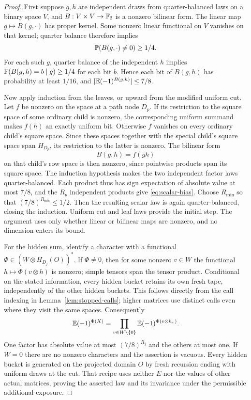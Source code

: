 \begin{proof}
First suppose $g,h$ are independent draws from quarter-balanced laws on a
binary space $V$, and $B:V\times V\to\mathbb F_2$ is a nonzero bilinear form.  The
linear map $g\mapsto B(g,\cdot)$ has proper kernel.  Some nonzero linear
functional on $V$ vanishes on that kernel; quarter balance therefore implies
\[
 \mathbb P(B(g,\cdot)\ne0)\ge1/4.
\]
For each such $g$, quarter balance of the independent $h$ implies
$\mathbb P(B(g,h)=b\mid g)\ge1/4$ for each bit $b$.  Hence each bit of $B(g,h)$
has probability at least $1/16$, and
$|\mathbb E(-1)^{B(g,h)}|\le7/8$.

Now apply induction from the leaves, or upward from the modified uniform
cut.  Let $f$ be nonzero on the space at a path node $D_p$.  If its
restriction to the square space of some ordinary child is nonzero, the
corresponding uniform summand makes $f(h)$ an exactly uniform bit.  Otherwise
$f$ vanishes on every ordinary child's square space.  Since these spaces
together with the special child's square space span $H_{D_p}$, its
restriction to the latter is nonzero.  The bilinear form
\[
 B(g,h)=f(gh)
\]
on that child's row space is then nonzero, since pointwise products span its
square space.  The induction hypothesis makes the two independent factor
laws quarter-balanced.  Each product thus has sign expectation of absolute
value at most $7/8$, and the $R_p$ independent products give
\eqref{eq:scalar-bias}.  Choose $R_{\min}$ so that
$(7/8)^{R_{\min}}\le1/2$.  Then the resulting scalar law is again
quarter-balanced, closing the induction.  Uniform cut and leaf laws provide
the initial step.  The argument uses only whether linear or bilinear maps
are nonzero, and no dimension enters its bound.

For the hidden sum, identify a character with a functional
$\Phi\in(W\otimes H_{D_j}(O))^*$.  If $\Phi\ne0$, then for some nonzero
$v\in W$ the functional $h\mapsto\Phi(v\otimes h)$ is nonzero; simple
tensors span the tensor product.  Conditional on the stated information,
every hidden bucket retains its own fresh tape, independently of the other
hidden buckets.  This follows directly from the call indexing in
Lemma~\ref{lem:stopped-calls}; higher matrices use distinct calls even where
they visit the same spaces.  Consequently
\[
 \mathbb E(-1)^{\Phi(X)}=
 \prod_{v\in W\setminus\{0\}}
    \mathbb E(-1)^{\Phi(v\otimes h_v)}.
\]
One factor has absolute value at most $(7/8)^{R_j}$ and the others at most
one.  If $W=0$ there are no nonzero characters and the assertion is vacuous.
Every hidden bucket is generated on the projected domain $O$ by fresh
recursion ending with uniform draws at the cut.  That recipe uses neither
$E$ nor the values of other actual matrices, proving the asserted law and
its invariance under the permissible additional exposure.
\end{proof}

